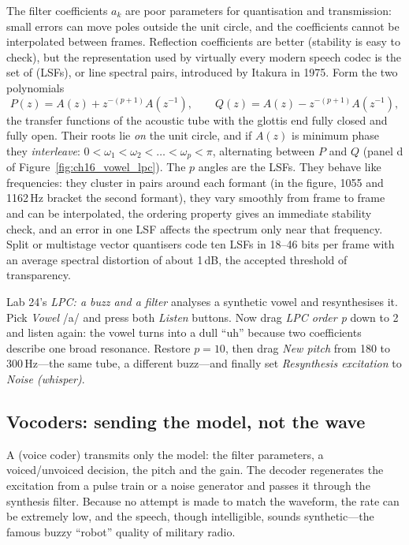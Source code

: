 The filter coefficients $a_k$ are poor parameters for quantisation and transmission: small errors
can move poles outside the unit circle, and the coefficients cannot be interpolated between frames.
Reflection coefficients are better (stability is easy to check), but the representation used by
virtually every modern speech codec is the set of  (LSFs), or line
spectral pairs, introduced by Itakura in 1975. Form the two polynomials
\begin{equation}
P(z)=A(z)+z^{-(p+1)}A(z^{-1}),\qquad Q(z)=A(z)-z^{-(p+1)}A(z^{-1}),
\label{eq:ch16:lsf}
\end{equation}
the transfer functions of the acoustic tube with the glottis end fully closed and fully open.
Their roots lie \emph{on} the unit circle, and if $A(z)$ is minimum phase they \emph{interleave}:
$0<\omega_1<\omega_2<\dots<\omega_p<\pi$, alternating between $P$ and $Q$ (panel d of
Figure~\ref{fig:ch16_vowel_lpc}). The $p$ angles are the LSFs. They behave like frequencies: they
cluster in pairs around each formant (in the figure, 1055 and 1162\,Hz bracket the second formant),
they vary smoothly from frame to frame and can be interpolated, the ordering property gives an
immediate stability check, and an error in one LSF affects the spectrum only near that frequency.
Split or multistage vector quantisers code ten LSFs in 18--46 bits per frame with an average spectral
distortion of about 1\,dB, the accepted threshold of transparency.

\begin{tryit}[Be a vocoder]
Lab 24's \emph{LPC: a buzz and a filter} analyses a synthetic vowel and resynthesises it. Pick
\emph{Vowel} /a/ and press both \emph{Listen} buttons. Now drag \emph{LPC order p} down to 2 and
listen again: the vowel turns into a dull ``uh'' because two coefficients describe one broad
resonance. Restore $p=10$, then drag \emph{New pitch} from 180 to 300\,Hz---the same tube, a
different buzz---and finally set \emph{Resynthesis excitation} to \emph{Noise (whisper)}.
\end{tryit}

\subsection{Vocoders: sending the model, not the wave}

A  (voice coder) transmits only the model: the filter parameters, a voiced/unvoiced
decision, the pitch and the gain. The decoder regenerates the excitation from a pulse train or a noise
generator and passes it through the synthesis filter. Because no attempt is made to match the
waveform, the rate can be extremely low, and the speech, though intelligible, sounds synthetic---the
famous buzzy ``robot'' quality of military radio.


